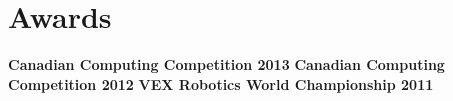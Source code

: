 \documentclass[]{peter_resume}
\begin{document}
\begin{minipage}{\textwidth}

\section{Awards} 
{
\textbf {Canadian Computing Competition 2013}
}
{
\textbf {Canadian Computing Competition 2012}
}
{
\textbf {VEX Robotics World Championship 2011}
}
\sectionsep

\end{minipage}
\end{document}
